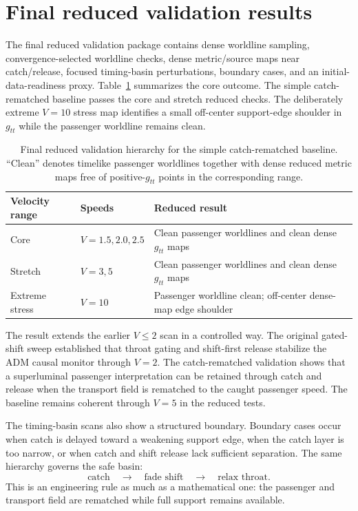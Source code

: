 \documentclass[11pt]{article}
\begin{document}
\section{Final reduced validation results}
The final reduced validation package \citep{goldman_final_validation_2026} contains dense worldline sampling, convergence-selected worldline checks, dense metric/source maps near catch/release, focused timing-basin perturbations, boundary cases, and an initial-data-readiness proxy.  Table~\ref{tab:velocity_results} summarizes the core outcome.  The simple catch-rematched baseline passes the core and stretch reduced checks.  The deliberately extreme $V=10$ stress map identifies a small off-center support-edge shoulder in $g_{tt}$ while the passenger worldline remains clean.

\begin{table}[ht]
\centering
\caption{Final reduced validation hierarchy for the simple catch-rematched baseline.  ``Clean'' denotes timelike passenger worldlines together with dense reduced metric maps free of positive-$g_{tt}$ points in the corresponding range.}
\label{tab:velocity_results}
\begin{tabular}{lll}
\toprule
Velocity range & Speeds & Reduced result \\
\midrule
Core & $V=1.5,2.0,2.5$ & Clean passenger worldlines and clean dense $g_{tt}$ maps \\
Stretch & $V=3,5$ & Clean passenger worldlines and clean dense $g_{tt}$ maps \\
Extreme stress & $V=10$ & Passenger worldline clean; off-center dense-map edge shoulder \\
\bottomrule
\end{tabular}
\end{table}

The result extends the earlier $V\le2$ scan in a controlled way.  The original gated-shift sweep established that throat gating and shift-first release stabilize the ADM causal monitor through $V=2$.  The catch-rematched validation shows that a superluminal passenger interpretation can be retained through catch and release when the transport field is rematched to the caught passenger speed.  The baseline remains coherent through $V=5$ in the reduced tests.

The timing-basin scans also show a structured boundary.  Boundary cases occur when catch is delayed toward a weakening support edge, when the catch layer is too narrow, or when catch and shift release lack sufficient separation.  The same hierarchy governs the safe basin:
\begin{equation}
 \text{catch} \quad \longrightarrow \quad \text{fade shift} \quad \longrightarrow \quad \text{relax throat}.
\end{equation}
This is an engineering rule as much as a mathematical one: the passenger and transport field are rematched while full support remains available.
\end{document}
